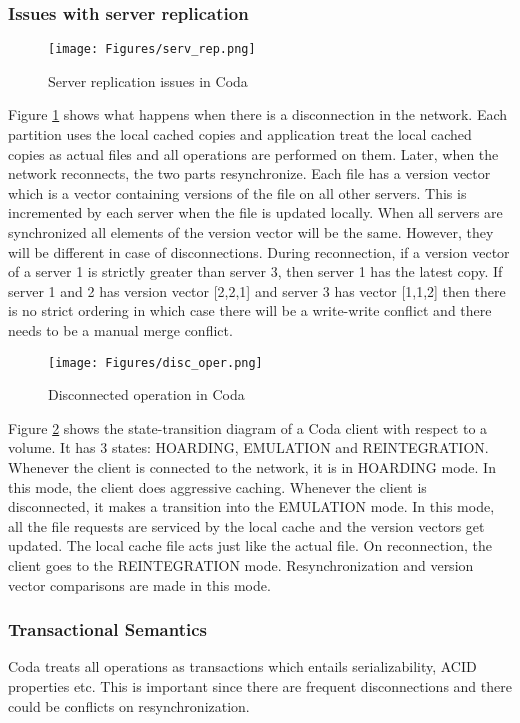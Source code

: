 \documentclass[twoside]{article}
\begin{document}
\subsubsection{Issues with server replication}
\begin{figure}[htbp]
\centering
\texttt{[image: Figures/serv\_rep.png]}
\caption{Server replication issues in Coda} \label{fig:serv_rep}
\end{figure}
Figure \ref{fig:serv_rep} shows what happens when there is a disconnection in the network. Each partition uses the local cached copies and application treat the local cached copies as actual files and all operations are performed on them. Later, when the network reconnects, the two parts resynchronize. Each file has a version vector which is a vector containing versions of the file on all other servers. This is incremented by each server when the file is updated locally. When all servers are synchronized all elements of the version vector will be the same. However, they will be different in case of disconnections. During reconnection, if a version vector of a server 1 is strictly greater than server 3, then server 1 has the latest copy. If server 1 and 2 has version vector [2,2,1] and server 3 has vector [1,1,2] then there is no strict ordering in which case there will be a write-write conflict and there needs to be a manual merge conflict.

\begin{figure}[htbp]
\centering
\texttt{[image: Figures/disc\_oper.png]}
\caption{Disconnected operation in Coda} \label{fig:disc_oper}
\end{figure}
Figure \ref{fig:disc_oper} shows the state-transition diagram of a Coda client with respect to a volume. It has $3$ states: HOARDING, EMULATION and REINTEGRATION. Whenever the client is connected to the network, it is in HOARDING mode. In this mode, the client does aggressive caching. Whenever the client is disconnected, it makes a transition into the EMULATION mode. In this mode, all the file requests are serviced by the local cache and the version vectors get updated. The local cache file acts just like the actual file. On reconnection, the client goes to the REINTEGRATION mode. Resynchronization and version vector comparisons are made in this mode.


\subsubsection{Transactional Semantics}
Coda treats all operations as transactions which entails serializability, ACID properties etc. This is important since there are frequent disconnections and there could be conflicts on resynchronization.
\end{document}
